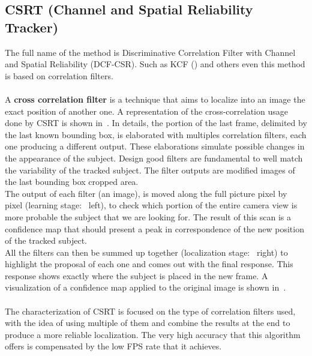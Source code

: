 \subsection{CSRT (Channel and Spatial Reliability Tracker)}
The full name of the method is Discriminative Correlation Filter with Channel and Spatial Reliability (DCF-CSR)\cite{csrt}. Such as KCF () and others even this method is based on correlation filters.\\
\\
A \textbf{cross correlation filter} is a technique that aims to localize into an image the exact position of another one. A representation of the cross-correlation usage done by CSRT is shown in~. In details, the portion of the last frame, delimited by the last known bounding box, is elaborated with multiples correlation filters, each one producing a different output. These elaborations simulate possible changes in the appearance of the subject. Design good filters are fundamental to well match the variability of the tracked subject. The filter outputs are modified images of the last bounding box cropped area.\\
The output of each filter (an image), is moved along the full picture pixel by pixel (learning stage:~ left), to check which portion of the entire camera view is more probable the subject that we are looking for. The result of this scan is a confidence map that should present a peak in correspondence of the new position of the tracked subject.\\
All the filters can then be summed up together (localization stage:~ right) to highlight the proposal of each one and comes out with the final response. This response shows exactly where the subject is placed in the new frame. A visualization of a confidence map applied to the original image is shown in~.\\
\\
The characterization of CSRT is focused on the type of correlation filters used, with the idea of using multiple of them and combine the results at the end to produce a more reliable localization. The very high accuracy that this algorithm offers is compensated by the low FPS rate that it achieves.

